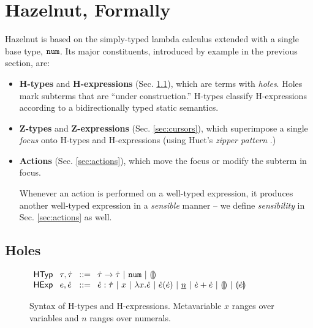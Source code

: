 \documentclass{llncs}
\begin{document}


\section{Hazelnut, Formally}
\label{sec:hazel}
Hazelnut is based on the simply-typed lambda calculus extended with a single base type, $\texttt{num}$. Its major constituents, introduced by example in the previous section, are:
\begin{itemize}
\item \textbf{H-types} and \textbf{H-expressions} (Sec. \ref{sec:holes}), which are terms with \emph{holes}. Holes mark subterms that are ``under construction.'' H-types classify H-expressions according to a {bidirectionally typed} static semantics.
\item \textbf{Z-types} and \textbf{Z-expressions} (Sec. \ref{sec:cursors}), which superimpose a single \emph{focus} onto H-types and H-expressions (using Huet's \emph{zipper pattern} \cite{JFP::Huet1997}.)
\item \textbf{Actions} (Sec. \ref{sec:actions}), which move the focus or modify the subterm in focus.

Whenever an action is performed on a well-typed expression, it produces another well-typed expression in a \emph{sensible} manner -- we define \emph{sensibility} in Sec. \ref{sec:actions} as well.
\end{itemize}

\subsection{Holes}\label{sec:holes}
\begin{figure}[t]
$\arraycolsep=4pt\begin{array}{lllllll}
\mathsf{HTyp} & \tau,\htau & ::= &
  \tarr{\htau}{\htau} ~\vert~
  \tnum ~\vert~
  \tehole\\
\mathsf{HExp} & e,\hexp & ::= &
  \hexp : \htau ~\vert~
  x ~\vert~
  \hlam{x}{\hexp} ~\vert~
  \hap{\hexp}{\hexp} ~\vert~
  \hnum{n} ~\vert~
  \hadd{\hexp}{\hexp} ~\vert~
  \hehole ~\vert~
  \hhole{\hexp}
\end{array}$
\caption{Syntax of H-types and H-expressions. Metavariable $x$ ranges over variables and $n$ ranges over numerals.}
\label{fig:hexp-syntax}
\end{figure}
\end{document}

